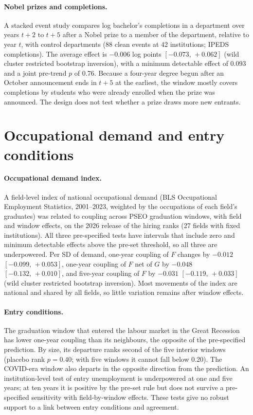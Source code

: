 \documentclass[11pt]{article}
\newcommand{\ci}[2]{$[#1,\allowbreak\,#2]$}
\begin{document}
\paragraph{Nobel prizes and completions.} A stacked event study compares log bachelor's completions in a
department over years $t+2$ to $t+5$ after a Nobel prize to a member of the department, relative to year $t$, with
control departments (88 clean events at 42 institutions; IPEDS completions). The average effect is $-0.006$ log
points \ci{-0.073}{+0.062} (wild cluster
restricted bootstrap inversion), with a minimum detectable effect of 0.093 and a joint pre-trend $p$ of 0.76. Because
a four-year degree begun after an October announcement ends in $t+5$ at the earliest, the window mostly covers
completions by students who were already enrolled when the prize was announced. The design does not test whether a
prize draws more new entrants.

\section{Occupational demand and entry conditions}\label{sec:si-demand}

\paragraph{Occupational demand index.} A field-level index of national occupational demand (BLS
Occupational Employment Statistics, 2001--2023, weighted by the occupations of each field's graduates) was related
to coupling across PSEO graduation windows, with field and window effects, on the 2026 release of the hiring ranks
(27 fields with fixed institutions). All three pre-specified tests have intervals that
include zero and minimum detectable effects above the pre-set threshold, so all three are underpowered. Per SD of
demand, one-year coupling of $F$ changes by $-0.012$ \ci{-0.099}{+0.053}, one-year coupling of $F$ net of $G$ by
$-0.048$ \ci{-0.132}{+0.010}, and five-year coupling of $F$ by $-0.031$ \ci{-0.119}{+0.033} (wild cluster
restricted bootstrap inversion). Most movements of the index are national and shared by all fields, so little
variation remains after window effects.

\paragraph{Entry conditions.} The graduation window that entered the labour market in the Great
Recession has lower one-year coupling than its neighbours, the opposite of the pre-specified prediction. By size, its
departure ranks second of the five interior windows (placebo rank $p=0.40$; with five windows it cannot fall below
0.20). The COVID-era window also departs in the opposite direction from the prediction. An institution-level test of entry unemployment is underpowered at one and
five years; at ten years it is positive by the pre-set rule but does not survive a pre-specified sensitivity with
field-by-window effects. These tests give no robust support to a link between entry conditions and agreement.
\end{document}
